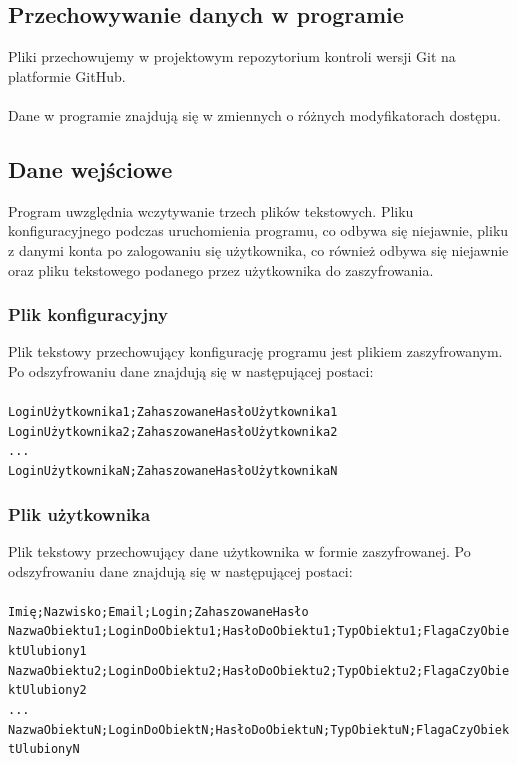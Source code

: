 \documentclass[a4paper]{article}
\newcommand{\prog}{\texttt}
\begin{document}
\subsection{Przechowywanie danych w programie}
Pliki przechowujemy w projektowym repozytorium kontroli wersji Git na platformie GitHub.\\ \\
Dane w programie znajdują się w zmiennych o różnych modyfikatorach dostępu.

\subsection{Dane wejściowe}
Program uwzględnia wczytywanie trzech plików tekstowych. Pliku konfiguracyjnego podczas uruchomienia programu, co odbywa się niejawnie, pliku z danymi konta po zalogowaniu się użytkownika, co również odbywa się niejawnie oraz pliku tekstowego podanego przez użytkownika do zaszyfrowania.

\subsubsection{Plik konfiguracyjny}\label{pKonf}
Plik tekstowy przechowujący konfigurację programu jest plikiem zaszyfrowanym. Po odszyfrowaniu dane znajdują się w następującej postaci:\\ \\
\prog{LoginUżytkownika1;ZahaszowaneHasłoUżytkownika1\\LoginUżytkownika2;ZahaszowaneHasłoUżytkownika2\\...\\LoginUżytkownikaN;ZahaszowaneHasłoUżytkownikaN}

\subsubsection{Plik użytkownika}\label{pUzy}
Plik tekstowy przechowujący dane użytkownika w formie zaszyfrowanej. Po odszyfrowaniu dane znajdują się w następującej postaci:\\ \\
\prog{Imię;Nazwisko;Email;Login;ZahaszowaneHasło\\NazwaObiektu1;LoginDoObiektu1;HasłoDoObiektu1;TypObiektu1;FlagaCzyObiektUlubiony1\\NazwaObiektu2;LoginDoObiektu2;HasłoDoObiektu2;TypObiektu2;FlagaCzyObiektUlubiony2\\...\\NazwaObiektuN;LoginDoObiektN;HasłoDoObiektuN;TypObiektuN;FlagaCzyObiektUlubionyN}
\end{document}
